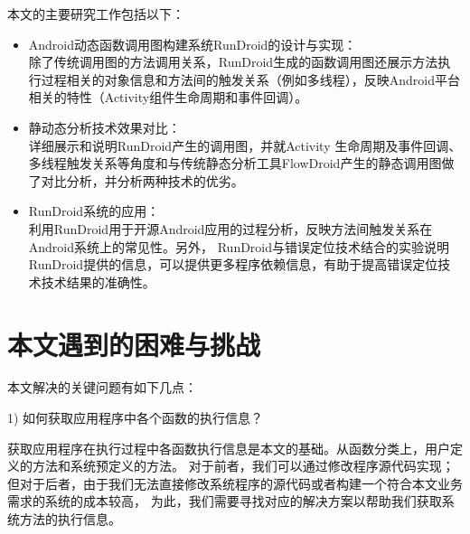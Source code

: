 本文的主要研究工作包括以下：
\begin{itemize}
	\setlength{\itemsep}{1pt}
	\setlength{\parskip}{0pt}
	\setlength{\parsep}{0pt}
	\item  Android动态函数调用图构建系统RunDroid的设计与实现：
	\\
	除了传统调用图的方法调用关系，RunDroid生成的函数调用图还展示方法执行过程相关的对象信息和方法间的触发关系（例如多线程），反映Android平台相关的特性（Activity组件生命周期和事件回调）。
	\item 静动态分析技术效果对比：
	\\
	详细展示和说明RunDroid产生的调用图，并就Activity 生命周期及事件回调、多线程触发关系等角度和与传统静态分析工具FlowDroid产生的静态调用图做了对比分析，并分析两种技术的优劣。
	\item RunDroid系统的应用：
	\\
	利用RunDroid用于开源Android应用的过程分析，反映方法间触发关系在Android系统上的常见性。另外， RunDroid与错误定位技术结合的实验说明RunDroid提供的信息，可以提供更多程序依赖信息，有助于提高错误定位技术技术结果的准确性。
\end{itemize}



\section{本文遇到的困难与挑战}


本文解决的关键问题有如下几点：

1)	如何获取应用程序中各个函数的执行信息？

获取应用程序在执行过程中各函数执行信息是本文的基础。从函数分类上，用户定义的方法和系统预定义的方法。
对于前者，我们可以通过修改程序源代码实现；但对于后者，由于我们无法直接修改系统程序的源代码或者构建一个符合本文业务需求的系统的成本较高，
为此，我们需要寻找对应的解决方案以帮助我们获取系统方法的执行信息。

